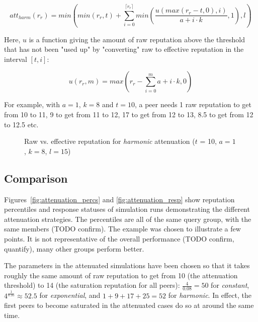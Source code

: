 \[att_{harm}(r_r) = min(min(r_r, t) + \sum_{i=0}^{\lceil r_r
\rceil}{min(\frac{u(max(r_r - t, 0), i)}{a + i \cdot k}, 1)}, l)\]

Here, $u$ is a function giving the amount of raw reputation above the threshold
that has not been "used up" by "converting" raw to effective reputation in the
interval $[t, i]$:

\[u(r_r, m) = max(r_r - \sum_{i=0}^m{a + i \cdot k}, 0)\]

For example, with $a = 1$, $k = 8$ and $t = 10$, a peer needs 1 raw reputation
to get from 10 to 11, 9 to get from 11 to 12, 17 to get from 12 to 13, 8.5 to
get from 12 to 12.5 etc.

\begin{figure}[t]
\centering
{}
\caption{Raw vs. effective reputation for \emph{harmonic} attenuation ($t$ = 10,
$a = 1$, $k = 8$, $l = 15$)}
\label{fig:att_harm_raw_vs_eff}
\end{figure}

\subsection{Comparison}
Figures~\ref{fig:attenuation_percs} and \ref{fig:attenuation_resp} show
reputation percentiles and response statuses of simulation runs demonstrating
the different attenuation strategies. The percentiles are all of the same query
group, with the same members (TODO confirm). The example was chosen to
illustrate a few points. It is not representative of the overall performance
(TODO confirm, quantify), many other groups perform better.

The parameters in the attenuated simulations have been chosen so that it takes
roughly the same amount of raw reputation to get from 10 (the attenuation
threshold) to 14 (the saturation reputation for all peers): $\frac{4}{0.08} =
50$ for \emph{constant}, $4^{\frac{1}{0.35}} \approx 52.5$ for
\emph{exponential}, and $1 + 9 + 17 + 25 = 52$ for \emph{harmonic}. In effect,
the first peers to become saturated in the attenuated cases do so at around the
same time.

